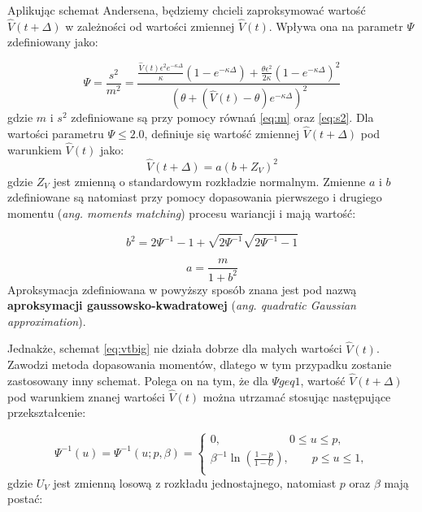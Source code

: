 \documentclass{pracamgr}
\begin{document}
Aplikując schemat Andersena, będziemy chcieli zaproksymować wartość  $\hat{V}(t + \Delta)$ w zależności od wartości zmiennej $\hat{V}(t)$. Wpływa ona na parametr $\Psi$ zdefiniowany jako:



\begin{equation}
 \label{eq:ksi}
 \Psi = \frac{s^2}{m^2} = \frac{\frac{\hat{V}(t)\epsilon^2 e^{-\kappa \Delta}}{\kappa} (1 - e^{-\kappa \Delta}) + \frac{\theta \epsilon^2}{2 \kappa}(1 - e^{-\kappa \Delta})^2}{(\theta + (\hat{V}(t) - \theta) e^{-\kappa \Delta})^2} 
\end{equation}
gdzie $m$ i $s^2$ zdefiniowane są przy pomocy równań \ref{eq:m} oraz \ref{eq:s2}.
Dla wartości parametru $\Psi \leq 2.0$, definiuje się wartość zmiennej  $\hat{V}(t + \Delta)$  pod warunkiem  $\hat{V}(t)$ jako:
\begin{equation}
 \label{eq:vtbig}
\hat{V}(t + \Delta)  = a (b + Z_V)^2
\end{equation}
gdzie $Z_V$ jest zmienną o standardowym rozkładzie normalnym. Zmienne $a$ i $b$ zdefiniowane są natomiast przy pomocy dopasowania pierwszego i drugiego momentu (\textit{ang. moments matching}) procesu wariancji i mają wartość:


\begin{equation}
\label{eq:b}
b^2 = 2 \Psi^{-1} - 1 + \sqrt{2 \Psi^{-1}} \sqrt{2 \Psi^{-1} - 1}
\end{equation}

\begin{equation}
\label{eq:a}
a = \frac{m}{1 + b^2}
\end{equation}
Aproksymacja zdefiniowana w powyższy sposób znana jest pod nazwą \textbf{aproksymacji gaussowsko-kwadratowej} (\textit{ang. quadratic Gaussian approximation}).


Jednakże, schemat \ref{eq:vtbig} nie działa dobrze dla małych wartości $\hat{V}(t)$. Zawodzi metoda dopasowania momentów, dlatego w tym przypadku 
zostanie zastosowany inny schemat. Polega on na tym, że dla $\Psi geq 1$, wartość $\hat{V}(t + \Delta)$ pod warunkiem znanej wartości $\hat{V}(t)$ można utrzamać stosując następujące przekształcenie:

\begin{equation}
\label{eq:psi}
\Psi^{-1}(u) = \Psi^{-1}(u;p,\beta) = \begin{cases}
               0, \qquad \qquad \qquad  0 \le u \leq p,\\
               \beta^{-1} \ln (\frac{1-p}{1-U}), \qquad  p \le u \leq 1, \\
            \end{cases} 
\end{equation} 
gdzie $U_V$ jest zmienną losową z rozkładu jednostajnego, natomiast $p$ oraz $\beta$ mają postać:
\end{document}
